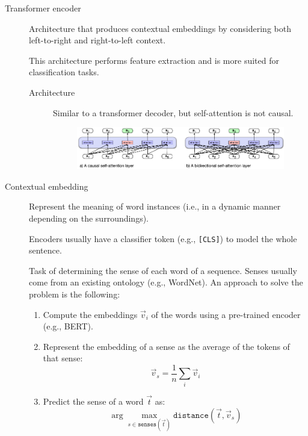 \begin{description}
    \item[Transformer encoder] 
        Architecture that produces contextual embeddings by considering both left-to-right and right-to-left context.

        \begin{remark}
            This architecture performs feature extraction and is more suited for classification tasks.
        \end{remark}

        \begin{description}
            \item[Architecture]
                Similar to a transformer decoder, but self-attention is not causal.

                \begin{figure}[H]
                    \centering
                    \includegraphics[width=0.75\linewidth]{./img/_decoder_vs_encoder.pdf}
                \end{figure}
        \end{description}

    \item[Contextual embedding] 
        Represent the meaning of word instances (i.e., in a dynamic manner depending on the surroundings).

        \begin{remark}
            Encoders usually have a classifier token (e.g., \texttt{[CLS]}) to model the whole sentence.
        \end{remark}

        \begin{example}
            Task of determining the sense of each word of a sequence. Senses usually come from an existing ontology (e.g., WordNet). An approach to solve the problem is the following:
            \begin{enumerate}
                \item Compute the embeddings $\vec{v}_i$ of the words using a pre-trained encoder (e.g., BERT).
                \item Represent the embedding of a sense as the average of the tokens of that sense:
                \[ \vec{v}_s = \frac{1}{n} \sum_i \vec{v}_i \]
                \item Predict the sense of a word $\vec{t}$ as:
                \[ \arg\max_{s \in \texttt{senses}(\vec{t})} \texttt{distance}(\vec{t}, \vec{v}_s) \]
            \end{enumerate}
        \end{example}
\end{description}

